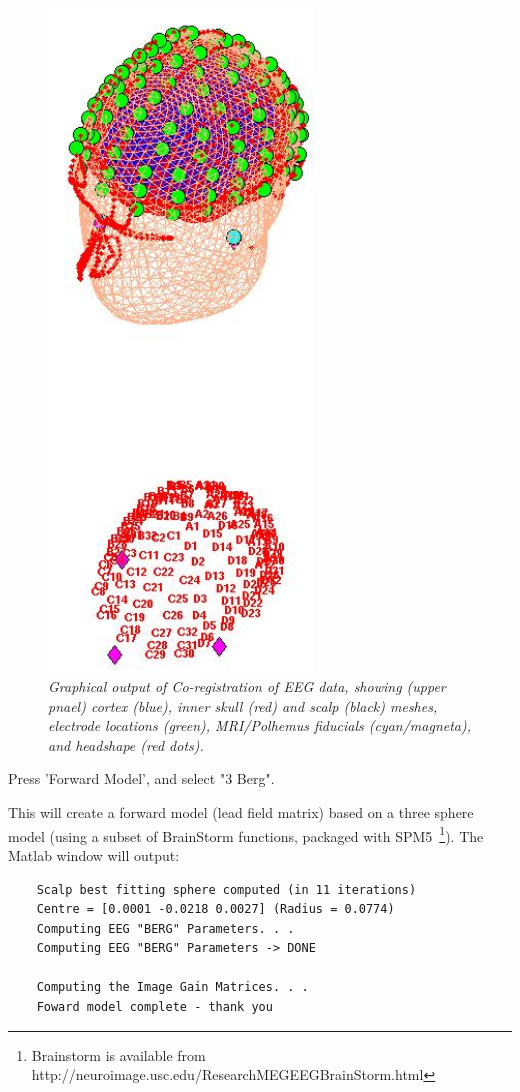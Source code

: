 \begin{figure}
\begin{center}
\includegraphics[width=70mm]{multimodal/figures/figure_32_8}
\caption{\em  Graphical output of Co-registration of EEG data, showing (upper pnael) cortex (blue), inner skull (red) and scalp (black) meshes, electrode locations (green), MRI/Polhemus fiducials (cyan/magneta), and headshape (red dots).\label{fig_32_8}}
\end{center}
\end{figure}

\noindent * Press 'Forward Model', and select "3 {Berg}".

This will create a forward model (lead field matrix) based on a three sphere model (using a subset of BrainStorm functions, packaged with SPM5~\footnote{Brainstorm is available from http://neuroimage.usc.edu/ResearchMEGEEGBrainStorm.html}). The Matlab window will output:
\begin{verbatim}
	Scalp best fitting sphere computed (in 11 iterations)
	Centre = [0.0001 -0.0218 0.0027] (Radius = 0.0774)
	Computing EEG "BERG" Parameters. . .
	Computing EEG "BERG" Parameters -> DONE

	Computing the Image Gain Matrices. . .
	Foward model complete - thank you
 \end{verbatim}

